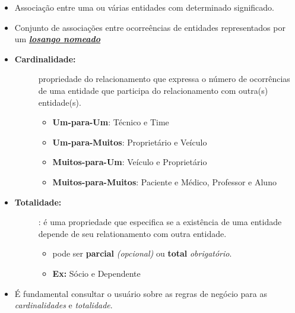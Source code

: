 \documentclass[12pt,a4paper,titlepage]{article}
\begin{document}
\begin{itemize}
    \item
        Associação entre uma ou várias entidades com determinado significado.
    \item
        Conjunto de associações entre ocorreências de entidades representados por um \textit{\textbf{\underline{losango nomeado}}}
    \item \begin{description}
            \item[\textbf{Cardinalidade:}] 
                propriedade do relacionamento que expressa o nú\-me\-ro de ocorrências de uma entidade que participa do relacionamento com outra(s) entidade(s).
                \begin{itemize}
                    \item \textbf{Um-para-Um}: Técnico e Time
                    \item \textbf{Um-para-Muitos}: Proprietário e Veículo
                    \item \textbf{Muitos-para-Um}: Veículo e Proprietário
                    \item \textbf{Muitos-para-Muitos}: Paciente e Médico, Professor e Aluno
                \end{itemize}
     \end{description}
     \item \begin{description}
             \item[\textbf{Totalidade:}]: é uma propriedade que especifica se a existência de uma entidade depende de seu relationamento com outra entidade.
                 \begin{itemize}
                     \item pode ser \textbf{parcial} \textit{(opcional)} ou \textbf{total} \textit{obrigatório}.
                     \item \textbf{Ex:} Sócio e Dependente
                 \end{itemize}
         \end{description}
     \item É fundamental consultar o usuário sobre as regras de negócio para as \textit{cardinalidades} e \textit{totalidade}.
\end{itemize}

\newpage
\end{document}
